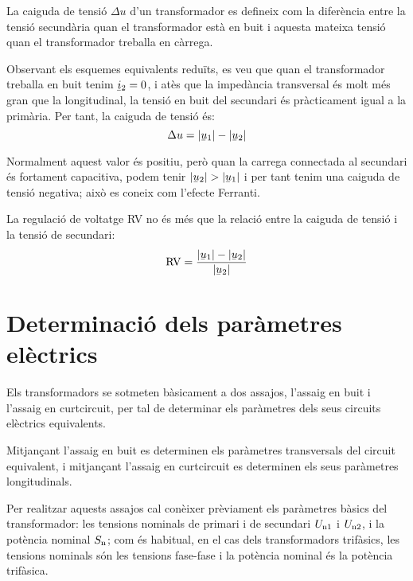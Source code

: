 La caiguda de tensió $\Delta u$ d'un transformador  es defineix com la diferència entre la tensió secundària quan el transformador està en buit i aquesta mateixa tensió quan el transformador treballa en càrrega.

Observant els esquemes equivalents reduïts, es veu que quan el transformador treballa en buit tenim $\cmplx{i}_2=0$, i atès que la impedància transversal és molt més gran que la longitudinal, la tensió en buit del secundari és pràcticament igual a la primària. Per tant, la caiguda de tensió és:
\begin{equation}
    \Delta u = |\cmplx{u}_1| - |\cmplx{u}_2|
\end{equation}

Normalment aquest valor és positiu, però quan la carrega connectada al secundari és fortament capacitiva, podem tenir  $|\cmplx{u}_2| > |\cmplx{u}_1|$ i per tant tenim una caiguda de tensió negativa; això es coneix com l'efecte Ferranti.

La regulació de voltatge RV no és més que la relació entre la caiguda de tensió i la tensió de secundari:
\begin{equation}
    \text{RV} = \frac{|\cmplx{u}_1| - |\cmplx{u}_2|}{|\cmplx{u}_2|}
\end{equation}

\section{Determinació dels paràmetres elèctrics}\label{sec:determ-param-trafo}

Els transformadors se sotmeten bàsicament a dos assajos, l'assaig en
buit i l'assaig en curtcircuit, per tal de determinar els paràmetres
dels seus circuits elèctrics equivalents.

Mitjançant l'assaig en buit es determinen els paràmetres
transversals del circuit equivalent, i mitjançant l'assaig en curtcircuit es determinen els seus paràmetres longitudinals.

Per  realitzar aquests assajos cal conèixer prèviament els paràmetres
bàsics del transformador: les tensions nominals de primari i de
secundari $U_\mathrm{n1}$ i $U_\mathrm{n2}$, i la potència nominal
$S_\mathrm{n}$; com és habitual, en el cas dels transformadors
trifàsics, les tensions nominals són les tensions fase-fase i la
potència nominal és la potència trifàsica.


